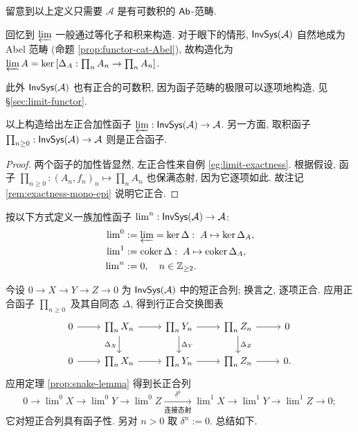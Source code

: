 留意到以上定义只需要 $\mathcal{A}$ 是有可数积的 $\mathsf{Ab}$-范畴.

回忆到 $\varprojlim$ 一般通过等化子和积来构造. 对于眼下的情形, $\mathsf{InvSys}(\mathcal{A})$ 自然地成为 Abel 范畴 (命题 \ref{prop:functor-cat-Abel}), 故构造化为 $\varprojlim A = \operatorname{ker}\left[ \Delta_A: \prod_n A_n \to \prod_n A_n \right]$.

此外 $\mathsf{InvSys}(\mathcal{A})$ 也有正合的可数积, 因为函子范畴的极限可以逐项地构造, 见 \S\ref{sec:limit-functor}.

\begin{lemma}
	以上构造给出左正合加性函子 $\varprojlim: \mathsf{InvSys}(\mathcal{A}) \to \mathcal{A}$. 另一方面, 取积函子 $\prod_{n \geq 0}: \mathsf{InvSys}(\mathcal{A}) \to \mathcal{A}$ 则是正合函子.
\end{lemma}
\begin{proof}
	两个函子的加性皆显然, 左正合性来自例 \ref{eg:limit-exactness}. 根据假设, 函子 $\prod_{n \geq 0}: (A_n, f_n)_n \mapsto \prod_n A_n$ 也保满态射, 因为它逐项如此. 故注记 \ref{rem:exactness-mono-epi} 说明它正合.
\end{proof}

\begin{definition}
	按以下方式定义一族加性函子 $\lim^n: \mathsf{InvSys}(\mathcal{A}) \to \mathcal{A}$:
	\begin{align*}
		\lim\nolimits^0 & := \varprojlim = \operatorname{ker} \Delta: \; A \mapsto \operatorname{ker} \Delta_A, \\
		\lim\nolimits^1 & := \operatorname{coker} \Delta: \; A \mapsto \operatorname{coker} \Delta_A , \\
		\lim\nolimits^n & := 0, \quad n \in \mathbb{Z}_{\geq 2}.
	\end{align*}
\end{definition}

今设 $0 \to X \to Y \to Z \to 0$ 为 $\mathsf{InvSys}(\mathcal{A})$ 中的短正合列; 换言之, 逐项正合. 应用正合函子 $\prod_{n \geq 0}$ 及其自同态 $\Delta$, 得到行正合交换图表
\[\begin{tikzcd}
	0 \arrow[r] & \prod_n X_n \arrow[r] \arrow[d, "\Delta_X"'] & \prod_n Y_n \arrow[r] \arrow[d, "\Delta_Y"] & \prod_n Z_n \arrow[d, "\Delta_Z"] \arrow[r] & 0 \\
	0 \arrow[r] & \prod_n X_n \arrow[r] & \prod_n Y_n \arrow[r] & \prod_n Z_n \arrow[r] & 0 .
\end{tikzcd}\]
应用定理 \ref{prop:snake-lemma} 得到长正合列
\[ 0 \to \lim\nolimits^0 X \to \lim\nolimits^0 Y \to \lim\nolimits^0 Z \xrightarrow[\text{连接态射}]{\delta^0} \lim\nolimits^1 X \to \lim\nolimits^1 Y \to \lim\nolimits^1 Z \to 0 ; \]
它对短正合列具有函子性. 另对 $n > 0$ 取 $\delta^n := 0$. 总结如下.


